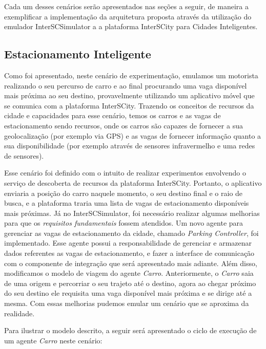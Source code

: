 Cada um desses cenários serão apresentados nas seções a seguir, de maneira a exemplificar a implementação da arquitetura proposta através da utilização do emulador
InterSCSimulator a a plataforma InterSCity para Cidades Inteligentes.

\subsection{Estacionamento Inteligente}
\label{sec:smart_parking}

Como foi apresentado, neste cenário de experimentação, emulamos um motorista realizando o seu percurso de carro e ao final procurando uma vaga disponível mais próxima ao
seu destino, provavelmente utilizando um aplicativo móvel que se comunica com a plataforma InterSCity.
Trazendo os conceitos de recursos da cidade e capacidades para esse cenário, temos os carros e as vagas de estacionamento sendo recursos, onde os carros são capazes de
fornecer a sua geolocalização (por exemplo via GPS) e as vagas de fornecer informação quanto a sua disponibilidade (por exemplo através de sensores infravermelho e uma
redes de sensores).

Esse cenário foi definido com o intuito de realizar experimentos envolvendo o serviço de descoberta de recursos da plataforma InterSCity.
Portanto, o aplicativo enviaria a posição do carro naquele momento, o seu destino final e o raio de busca, e a plataforma traria uma lista de vagas de estacionamento
disponíveis mais próximas.
Já no InterSCSimulator, foi necessário realizar algumas melhorias para que os \textit{requisitos fundamentais} fossem atendidos.
Um novo agente para gerenciar as vagas de estacionamento da cidade, chamado \textit{Parking Controller}, foi implementado.
Esse agente possui a responsabilidade de gerenciar e armazenar dados referentes as vagas de estacionamento, e fazer a interface de comunicação com o componente de
integração que será apresentado mais adiante.
Além disso, modificamos o modelo de viagem do agente \textit{Carro}.
Anteriormente, o \textit{Carro} saia de uma origem e percorriar o seu trajeto até o destino, agora ao chegar próximo do seu destino ele requisita uma vaga disponível mais
próxima e se dirige até a mesma.
Com essas melhorias pudemos emular um cenário que se aproxima da realidade.

Para ilustrar o modelo descrito, a seguir será apresentado o ciclo de execução de um agente \textit{Carro} neste cenário:

